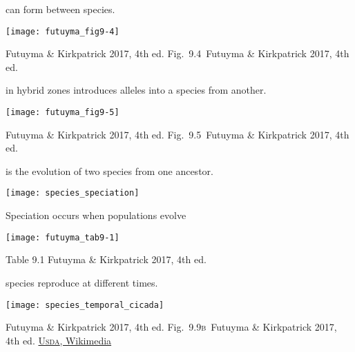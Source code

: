 \documentclass[t]{beamer}
\newcommand{\futuyma}[1]{%
	\ifthenelse{\isempty{#1}}%
	{Futuyma \& Kirkpatrick 2017, 4th ed.}%
	{Fig.~#1~Futuyma \& Kirkpatrick 2017, 4th ed.}%
}
\newcommand{\backskip}{\vspace{-0.5\baselineskip}}
\begin{document}


\begin{frame}{ can form between  species.}

\backskip

\centering

\texttt{[image: futuyma\_fig9-4]}

\tinyfill \futuyma{9.4}
\end{frame}

\begin{frame}{ in hybrid zones introduces alleles into a species from another.}

\backskip

\centering
\texttt{[image: futuyma\_fig9-5]}

\tinyfill \futuyma{9.5}

\end{frame}



\begin{frame}{ is the evolution of two species from one ancestor.}

\vspace{-\baselineskip}

\centering

\texttt{[image: species\_speciation]}

\end{frame}


\begin{frame}{Speciation occurs when populations evolve }

\backskip
\centering

\texttt{[image: futuyma\_tab9-1]}

\tinyfill Table 9.1 Futuyma \& Kirkpatrick 2017, 4th ed.

\end{frame}


\begin{frame}{ species reproduce at different times. }

\texttt{[image: species\_temporal\_cicada]}

\vfilll

\tiny {} \hfill \futuyma{9.9\textsc{b}} \quad \href{https://commons.wikimedia.org/wiki/File:Periodical_Cicada_Broods_of_the_United_States.png}{U\textsc{sda}, Wikimedia}

\end{frame}
\end{document}
